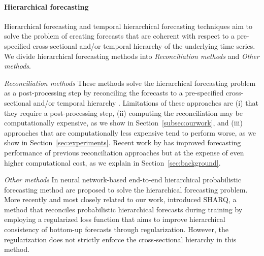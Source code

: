 \documentclass[preprint, 3p, times, twocolumn]{elsarticle}
\begin{document}
\paragraph{Hierarchical forecasting} Hierarchical forecasting \cite{hyndman_optimal_2011, hyndman_fast_2016, taieb_coherent_2017, bentaieb_regularized_2019, wickramasuriya_optimal_2019} and temporal hierarchical forecasting techniques \cite{taieb_sparse_2017,athanasopoulos_forecasting_2017,rangapuram_coherent_2023,theodosiou_forecasting_2021} aim to solve the problem of creating forecasts that are coherent with respect to a pre-specified cross-sectional and/or temporal hierarchy of the underlying time series. We divide hierarchical forecasting methods into \textit{Reconciliation methods} and \textit{Other methods}.

\textit{Reconciliation methods} These methods solve the hierarchical forecasting problem as a post-processing step by reconciling the forecasts to a pre-specified cross-sectional and/or temporal hierarchy \cite{hyndman_optimal_2011, hyndman_fast_2016, taieb_coherent_2017, bentaieb_regularized_2019, wickramasuriya_optimal_2019, panagiotelis_forecast_2021, girolimetto_point_2023}. Limitations of these approaches are (i) that they require a post-processing step, (ii) computing the reconciliation may be computationally expensive, as we show in Section~\ref{subsec:ourwork}, and (iii) approaches that are computationally less expensive tend to perform worse, as we show in Section~\ref{sec:experiments}. Recent work by \citet{taieb_sparse_2017, bentaieb_regularized_2019} has improved forecasting performance of previous reconciliation approaches but at the expense of even higher computational cost, as we explain in Section~\ref{sec:background}.

\textit{Other methods} In \cite{rangapuram_endtoend_2021,rangapuram_coherent_2023} neural network-based end-to-end hierarchical probabilistic forecasting method are proposed to solve the hierarchical forecasting problem. More recently and most closely related to our work, \citet{han_simultaneously_2021} introduced SHARQ, a method that reconciles probabilistic hierarchical forecasts during training by employing a regularized loss function that aims to improve hierarchical consistency of bottom-up forecasts through regularization. However, the regularization does not strictly enforce the cross-sectional hierarchy in this method.
\end{document}
